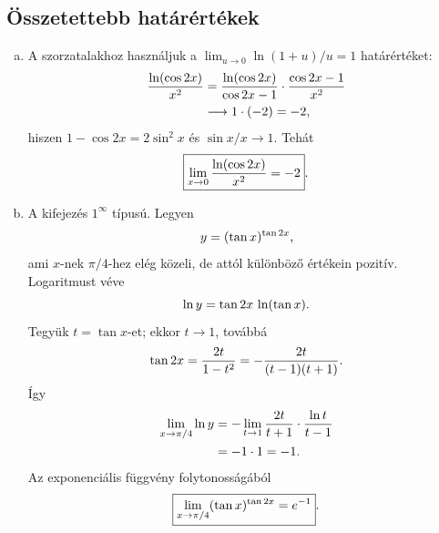 \documentclass{szb-solution}
\begin{document}
\subsection{Összetettebb határértékek}

\begin{enumerate}[a)]
  \item A szorzatalakhoz használjuk a
        $\lim_{u\to0}\ln(1+u)/u=1$ határértéket:
        \begin{align*}
          \frac{\ln(\cos2x)}{x^2}
          &=\frac{\ln(\cos2x)}{\cos2x-1}
            \cdot\frac{\cos2x-1}{x^2}\\
          &\longrightarrow1\cdot(-2)=-2
          \text,
        \end{align*}
        hiszen $1-\cos2x=2\sin^2x$ és $\sin x/x\to1$. Tehát
        $$
          \boxed{\displaystyle\lim_{x\to0}\frac{\ln(\cos2x)}{x^2}=-2}
          \text.
        $$

  \item A kifejezés $1^{\infty}$ típusú. Legyen
        $$
          y=(\tan x)^{\tan2x}
          \text,
        $$
        ami $x$-nek $\pi/4$-hez elég közeli, de attól különböző értékein
        pozitív. Logaritmust véve
        $$
          \ln y=\tan2x\,\ln(\tan x)
          \text.
        $$
        Tegyük $t=\tan x$-et; ekkor $t\to1$, továbbá
        $$
          \tan2x=\frac{2t}{1-t^2}
          =-\frac{2t}{(t-1)(t+1)}
          \text.
        $$
        Így
        \begin{align*}
          \lim_{x\to\pi/4}\ln y
          &=-\lim_{t\to1}
            \frac{2t}{t+1}\cdot\frac{\ln t}{t-1}\\
          &=-1\cdot1=-1
          \text.
        \end{align*}
        Az exponenciális függvény folytonosságából
        $$
          \boxed{\displaystyle
          \lim_{x\to\pi/4}(\tan x)^{\tan2x}=e^{-1}}
          \text.
        $$
\end{enumerate}
\end{document}

